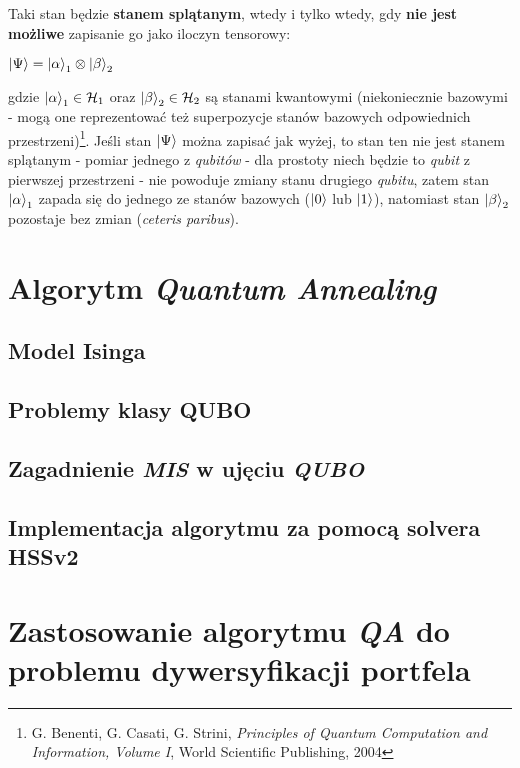 \documentclass[12pt,a4paper,twoside,openany]{book}
\begin{document}
Taki stan będzie \textbf{stanem splątanym}, wtedy i tylko wtedy, gdy \textbf{nie jest możliwe} zapisanie go jako iloczyn tensorowy:
\begin{center}
    $\ket{\Psi} = \ket{\alpha}_1 \otimes \ket{\beta}_2$
\end{center}
gdzie $\ket{\alpha}_1 \in \mathcal{H}_1$ oraz $\ket{\beta}_2 \in \mathcal{H}_2$ są stanami kwantowymi (niekoniecznie bazowymi - mogą one reprezentować też superpozycje stanów bazowych odpowiednich przestrzeni)\footnote{G. Benenti, G. Casati, G. Strini, \textit{Principles of Quantum Computation
and Information, Volume I}, World Scientific Publishing, 2004}.
Jeśli stan $\ket{\Psi}$ można zapisać jak wyżej, to stan ten nie jest stanem splątanym - pomiar jednego z \textit{qubitów} - dla prostoty niech będzie to \textit{qubit} z pierwszej przestrzeni - nie powoduje zmiany stanu drugiego \textit{qubitu}, zatem stan $\ket{\alpha}_1$ zapada się do jednego ze stanów bazowych ($\ket{0}$ lub $\ket{1}$), natomiast stan $\ket{\beta}_2$ pozostaje bez zmian (\textit{ceteris paribus}).




\chapter{Algorytm \textit{Quantum Annealing}}

\section{Model Isinga}

\section{Problemy klasy QUBO}

\section{Zagadnienie \textit{MIS} w ujęciu \textit{QUBO}}

\section{Implementacja algorytmu za pomocą solvera HSSv2}



\chapter{Zastosowanie algorytmu \textit{QA} do problemu dywersyfikacji portfela}
\end{document}
